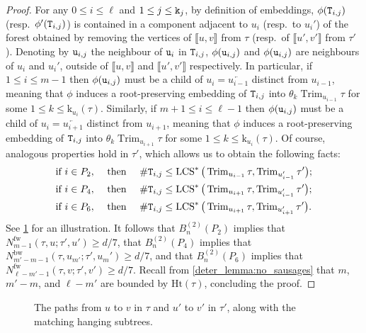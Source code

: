 \documentclass[11pt,reqno]{amsart}
\newcommand{\Ht}{\mathrm{Ht}}
\newcommand{\rk}{\mathrm{k}}
\newcommand{\Trim}{\operatorname{Trim}}
\newcommand{\LCS}{\operatorname{LCS}}
\newcommand{\fw}{\mathrm{fw}}
\newcommand{\bw}{\mathrm{bw}}
\begin{document}
\begin{proof}
For any $0\leq i\leq \ell$ and $1\leq j\leq \mathtt{k}_j$, by definition of embeddings, $\phi(\mathtt{T}_{i,j})$ (resp.~$\phi'(\mathtt{T}_{i,j})$) is contained in a component adjacent to $u_i$ (resp.~to $u_i'$) of the forest obtained by removing the vertices of $\llbracket u,v\rrbracket$ from $\tau$ (resp.~of $\llbracket u',v'\rrbracket$ from $\tau'$). Denoting by $\mathtt{u}_{i,j}$ the neighbour of $\mathtt{u}_i$ in $\mathtt{T}_{i,j}$, $\phi(\mathtt{u}_{i,j})$ and $\phi(\mathtt{u}_{i,j})$ are neighbours of $u_i$ and $u_i'$, outside of $\llbracket u,v\rrbracket$ and $\llbracket u',v'\rrbracket$ respectively. In particular, if $1\leq i\leq m-1$ then $\phi(\mathtt{u}_{i,j})$ must be a child of $u_i=\overleftarrow{u_{i-1}}$ distinct from $u_{i-1}$, meaning that $\phi$ induces a root-preserving embedding of $\mathtt{T}_{i,j}$ into $\theta_{k}\Trim_{u_{i-1}}\tau$ for some $1\leq k\leq \rk_{u_i}(\tau)$. Similarly, if $m+1\leq i\leq \ell-1$ then $\phi(\mathtt{u}_{i,j})$ must be a child of $u_i=\overleftarrow{u_{i+1}}$ distinct from $u_{i+1}$, meaning that $\phi$ induces a root-preserving embedding of $\mathtt{T}_{i,j}$ into $\theta_{k}\Trim_{u_{i+1}}\tau$ for some $1\leq k\leq \rk_{u_i}(\tau)$. Of course, analogous properties hold in $\tau'$, which allows us to obtain the following facts:
\begin{align*}
    \text{if }i\in P_2,\quad &\text{ then }\quad \#\ttT_{i,j}\leq \LCS^*\big(\Trim_{u_{i-1}}\tau,\Trim_{u_{i-1}'}\tau'\big);\\
    \text{if }i\in P_4,\quad &\text{ then }\quad \#\ttT_{i,j}\leq \LCS^*\big(\Trim_{u_{i+1}}\tau,\Trim_{u_{i-1}'}\tau'\big);\\
    \text{if }i\in P_6,\quad &\text{ then }\quad \#\ttT_{i,j}\leq \LCS^*\big(\Trim_{u_{i+1}}\tau,\Trim_{u_{i+1}'}\tau'\big).    
\end{align*}
See \cref{fig:skewers} for an illustration. It follows that $B_n^{(2)}(P_2)$ implies that $N_{m-1}^{\fw}(\tau,u;\tau',u')\geq d/7$, that $B_n^{(2)}(P_4)$ implies that $N_{m'-m-1}^{\bw}(\tau,u_{m'};\tau',u_{m}')\geq d/7$, and that $B_n^{(2)}(P_6)$ implies that $N_{\ell-m'-1}^{\fw}(\tau,v;\tau',v')\geq d/7$. Recall from \cref{deter_lemma:no_sausages} that $m$, $m'-m$, and $\ell-m'$ are bounded by $\Ht(\tau)$, concluding the proof.
\end{proof}

\begin{figure}[hbtp]
    \centering
    
    \caption{The paths from $u$ to $v$ in $\tau$ and $u'$ to $v'$ in $\tau'$, along with the matching hanging subtrees. }
    \label{fig:skewers}
\end{figure}
\end{document}
